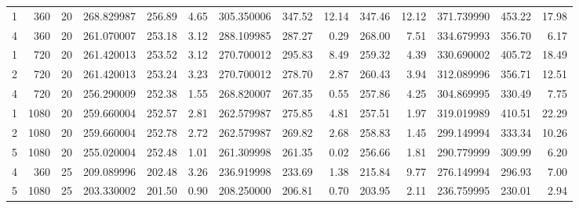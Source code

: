 \begin{tabular}{rrrrrrrrrrrrrr}
     1 &   360 &    20 &    268.829987 &     256.89 &            4.65 &     305.350006 &      347.52 &                12.14 &         347.46 &                   12.12 &    371.739990 &     453.22 &           17.98 \\
     4 &   360 &    20 &    261.070007 &     253.18 &            3.12 &     288.109985 &      287.27 &                 0.29 &         268.00 &                    7.51 &    334.679993 &     356.70 &            6.17 \\
     1 &   720 &    20 &    261.420013 &     253.52 &            3.12 &     270.700012 &      295.83 &                 8.49 &         259.32 &                    4.39 &    330.690002 &     405.72 &           18.49 \\
     2 &   720 &    20 &    261.420013 &     253.24 &            3.23 &     270.700012 &      278.70 &                 2.87 &         260.43 &                    3.94 &    312.089996 &     356.71 &           12.51 \\
     4 &   720 &    20 &    256.290009 &     252.38 &            1.55 &     268.820007 &      267.35 &                 0.55 &         257.86 &                    4.25 &    304.869995 &     330.49 &            7.75 \\
     1 &  1080 &    20 &    259.660004 &     252.57 &            2.81 &     262.579987 &      275.85 &                 4.81 &         257.51 &                    1.97 &    319.019989 &     410.51 &           22.29 \\
     2 &  1080 &    20 &    259.660004 &     252.78 &            2.72 &     262.579987 &      269.82 &                 2.68 &         258.83 &                    1.45 &    299.149994 &     333.34 &           10.26 \\
     5 &  1080 &    20 &    255.020004 &     252.48 &            1.01 &     261.309998 &      261.35 &                 0.02 &         256.66 &                    1.81 &    290.779999 &     309.99 &            6.20 \\
     4 &   360 &    25 &    209.089996 &     202.48 &            3.26 &     236.919998 &      233.69 &                 1.38 &         215.84 &                    9.77 &    276.149994 &     296.93 &            7.00 \\
     5 &  1080 &    25 &    203.330002 &     201.50 &            0.90 &     208.250000 &      206.81 &                 0.70 &         203.95 &                    2.11 &    236.759995 &     230.01 &            2.94 \\
\bottomrule
\end{tabular}
